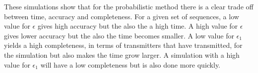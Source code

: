  

These simulations show that for the probabilistic method there is a clear trade off between time, accuracy and completeness.
For a given set of sequences, a low value for $\epsilon$ gives high accuracy but the also the a high time.
A high value for $\epsilon$ gives lower accuracy but the also the time becomes smaller.
A low value for $\epsilon_1$ yields a high completeness, in terms of transmitters that have transmitted, for the simulation but also makes the time grow larger.
A simulation with a high value for $\epsilon_1$ will have a low completeness but is also done more quickly.